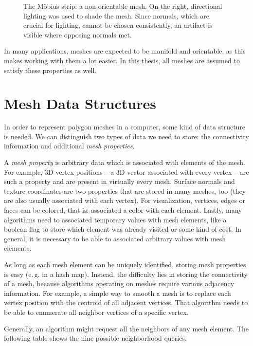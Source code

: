\begin{figure}[t]
  \centering
  
  \caption{The Möbius strip: a non-orientable mesh.
    On the right, directional lighting was used to shade the mesh.
    Since normals, which are crucial for lighting, cannot be chosen consistently, an artifact is visible where opposing normals met.}
  \label{fig:moebius}
\end{figure}


In many applications, meshes are expected to be manifold and orientable, as this makes working with them a lot easier.
In this thesis, all meshes are assumed to satisfy these properties as well.


\section{Mesh Data Structures}

In order to represent polygon meshes in a computer, some kind of data structure is needed.
We can distinguish two types of data we need to store: the connectivity information and additional \emph{mesh properties}.

A \emph{mesh property} is arbitrary data which is associated with elements of the mesh.
For example, 3D vertex positions -- a 3D vector associated with every vertex -- are such a property and are present in virtually every mesh.
Surface normals and texture coordinates are two properties that are stored in many meshes, too (they are also usually associated with each vertex).
For visualization, vertices, edges or faces can be colored, that is: associated a color with each element.
Lastly, many algorithms need to associated temporary values with mesh elements, like a boolean flag to store which element was already visited or some kind of cost.
In general, it is necessary to be able to associated arbitrary values with mesh elements.

As long as each mesh element can be uniquely identified, storing mesh properties is easy (e.\,g. in a hash map).
Instead, the difficulty lies in storing the connectivity of a mesh, because algorithms operating on meshes require various adjacency information.
For example, a simple way to smooth a mesh is to replace each vertex position with the centroid of all adjacent vertices.
That algorithm needs to be able to enumerate all neighbor vertices of a specific vertex.

Generally, an algorithm might request all the neighbors of any mesh element. The following table shows the nine possible neighborhood queries.

